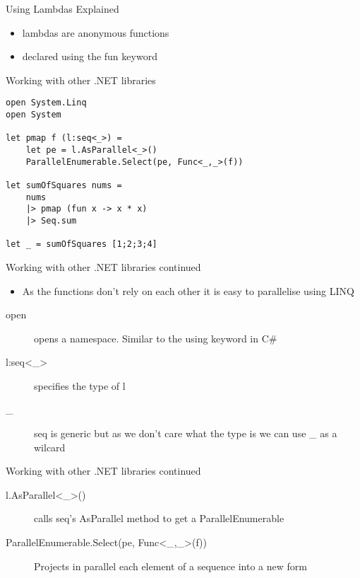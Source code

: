 \documentclass[landscape]{slides}
\begin{document}
\begin{slide}{Using Lambdas Explained}
\begin{itemize}
\item lambdas are anonymous functions
\item declared using the fun keyword
\end{itemize}
\end{slide}

\begin{slide}{Working with other .NET libraries}
\begin{verbatim}
open System.Linq
open System

let pmap f (l:seq<_>) =
    let pe = l.AsParallel<_>()
    ParallelEnumerable.Select(pe, Func<_,_>(f))

let sumOfSquares nums =
    nums
    |> pmap (fun x -> x * x) 
    |> Seq.sum

let _ = sumOfSquares [1;2;3;4]
\end{verbatim}
\end{slide}

\begin{slide}{Working with other .NET libraries continued}
\begin{itemize}
\item As the functions don't rely on each other it is easy to parallelise using LINQ
\end{itemize}
\begin{description}
\item[open] opens a namespace. Similar to the using keyword in C\#
\item[l:seq\textless\_\textgreater] specifies the type of l
\item[\_] seq is generic but as we don't care what the type is we can use \_ as a wilcard
\end{description}
\end{slide}

\begin{slide}{Working with other .NET libraries continued}
\begin{description}
\item[l.AsParallel\textless\_\textgreater()] calls seq's AsParallel method to get a ParallelEnumerable
\item[ParallelEnumerable.Select(pe, Func\textless\_,\_\textgreater(f))] Projects in parallel each element of a sequence into a new form
\end{description}
\end{slide}
\end{document}
